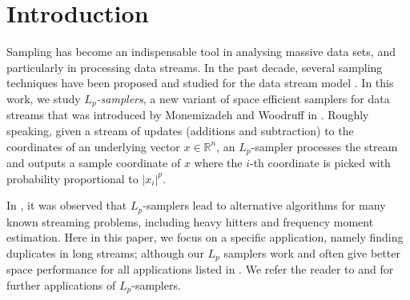 \documentclass[9pt,letterpaper]{article}
\theoremstyle{remark}
\begin{document}
\newpage
\setcounter{page}{1}
%
%
\section{Introduction}\label{sec:intro}


Sampling has become an indispensable tool in analysing massive data sets,
and particularly in processing data streams. In the past decade, 
several sampling techniques have been proposed and studied for the data stream
model \cite{BabcockDM02,DuffieldLT07,BravermanOZ09,CormodeMYZ10,MonemizadehW10,AndoniKO10}.
In this work, we study {\em $L_p$-samplers}, a new variant of
space efficient samplers for data streams that
was introduced by Monemizadeh and
Woodruff in \cite{MonemizadehW10}. 
 Roughly speaking, given a stream of updates (additions and subtraction) 
to the coordinates of an underlying vector $x \in \mathbb R^n$,
an $L_p$-sampler processes the stream and 
outputs a sample coordinate of $x$ where the
$i$-th coordinate is picked with probability proportional to
$|x_i|^p$.

In \cite{MonemizadehW10}, it was observed that $L_p$-samplers lead to 
alternative algorithms for many known streaming problems, including  
heavy hitters and frequency moment estimation. Here in this paper, we
focus on a specific application, namely finding duplicates in long streams;
although our $L_p$ samplers  work and often give better space performance
for all applications listed in \cite{MonemizadehW10}.
We refer the reader to \cite{MonemizadehW10} and \cite{AndoniKO10} 
for further applications of $L_p$-samplers.


\end{document}
